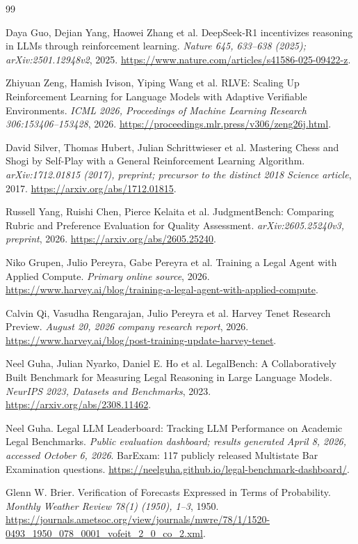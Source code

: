 \documentclass[11pt]{article}
\begin{document}
\begin{thebibliography}{99}

 Daya Guo, Dejian Yang, Haowei Zhang et al. DeepSeek-R1 incentivizes reasoning in LLMs through reinforcement learning. \emph{Nature 645, 633--638 (2025); arXiv:2501.12948v2}, 2025. \url{https://www.nature.com/articles/s41586-025-09422-z}.

 Zhiyuan Zeng, Hamish Ivison, Yiping Wang et al. RLVE: Scaling Up Reinforcement Learning for Language Models with Adaptive Verifiable Environments. \emph{ICML 2026, Proceedings of Machine Learning Research 306:153406--153428}, 2026. \url{https://proceedings.mlr.press/v306/zeng26j.html}.

 David Silver, Thomas Hubert, Julian Schrittwieser et al. Mastering Chess and Shogi by Self-Play with a General Reinforcement Learning Algorithm. \emph{arXiv:1712.01815 (2017), preprint; precursor to the distinct 2018 Science article}, 2017. \url{https://arxiv.org/abs/1712.01815}.

 Russell Yang, Ruishi Chen, Pierce Kelaita et al. JudgmentBench: Comparing Rubric and Preference Evaluation for Quality Assessment. \emph{arXiv:2605.25240v3, preprint}, 2026. \url{https://arxiv.org/abs/2605.25240}.

 Niko Grupen, Julio Pereyra, Gabe Pereyra et al. Training a Legal Agent with Applied Compute. \emph{Primary online source}, 2026. \url{https://www.harvey.ai/blog/training-a-legal-agent-with-applied-compute}.

 Calvin Qi, Vasudha Rengarajan, Julio Pereyra et al. Harvey Tenet Research Preview. \emph{August 20, 2026 company research report}, 2026. \url{https://www.harvey.ai/blog/post-training-update-harvey-tenet}.

 Neel Guha, Julian Nyarko, Daniel E. Ho et al. LegalBench: A Collaboratively Built Benchmark for Measuring Legal Reasoning in Large Language Models. \emph{NeurIPS 2023, Datasets and Benchmarks}, 2023. \url{https://arxiv.org/abs/2308.11462}.

 Neel Guha. Legal LLM Leaderboard: Tracking LLM Performance on Academic Legal Benchmarks. \emph{Public evaluation dashboard; results generated April 8, 2026, accessed October 6, 2026}. BarExam: 117 publicly released Multistate Bar Examination questions. \url{https://neelguha.github.io/legal-benchmark-dashboard/}.

 Glenn W. Brier. Verification of Forecasts Expressed in Terms of Probability. \emph{Monthly Weather Review 78(1) (1950), 1--3}, 1950. \url{https://journals.ametsoc.org/view/journals/mwre/78/1/1520-0493_1950_078_0001_vofeit_2_0_co_2.xml}.


\end{thebibliography}
\end{document}
